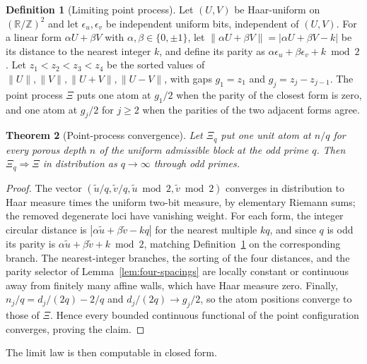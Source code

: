 \documentclass[11pt,a4paper]{article}
\newtheorem{theorem}{Theorem}[section]
\theoremstyle{definition}
\newtheorem{definition}[theorem]{Definition}
\theoremstyle{remark}
\begin{document}
\begin{definition}[Limiting point process]
  \label{def:porous-limit}
  Let $(U,V)$ be Haar-uniform on $(\mathbb{R}/\mathbb{Z})^2$ and let
  $\epsilon_u,\epsilon_v$ be independent uniform bits, independent of $(U,V)$.
  For a linear form $\alpha U+\beta V$ with $\alpha,\beta\in\{0,\pm1\}$, let
  $\|\alpha U+\beta V\|=|\alpha U+\beta V-k|$ be its distance to the nearest integer $k$,
  and define its parity as $\alpha\epsilon_u+\beta\epsilon_v+k\bmod2$.
  Let $z_1<z_2<z_3<z_4$ be the sorted values of
  $\|U\|,\|V\|,\|U+V\|,\|U-V\|$, with gaps $g_1=z_1$ and $g_j=z_j-z_{j-1}$.
  The point process $\Xi$ puts one atom at $g_1/2$ when the parity of the closest form is
  zero, and one atom at $g_j/2$ for $j\geq2$ when the parities of the two adjacent forms
  agree.
\end{definition}

\begin{theorem}[Point-process convergence]
  \label{thm:porous-convergence}
  Let $\Xi_q$ put one unit atom at $n/q$ for every porous depth $n$ of the uniform
  admissible block at the odd prime $q$.
  Then $\Xi_q\Rightarrow\Xi$ in distribution as $q\to\infty$ through odd primes.
\end{theorem}

\begin{proof}
  The vector $(\widetilde u/q,\widetilde v/q,\widetilde u\bmod2,\widetilde v\bmod2)$
  converges in distribution to Haar measure times the uniform two-bit measure, by
  elementary Riemann sums; the removed degenerate loci have vanishing weight.
  For each form, the integer circular distance is $|\alpha\widetilde u+\beta\widetilde v-kq|$
  for the nearest multiple $kq$, and since $q$ is odd its parity is
  $\alpha\widetilde u+\beta\widetilde v+k\bmod2$, matching
  Definition~\ref{def:porous-limit} on the corresponding branch.
  The nearest-integer branches, the sorting of the four distances, and the parity selector
  of Lemma~\ref{lem:four-spacings} are locally constant or continuous away from finitely
  many affine walls, which have Haar measure zero.
  Finally, $n_j/q=d_j/(2q)-2/q$ and $d_j/(2q)\to g_j/2$, so the atom positions converge to
  those of $\Xi$.
  Hence every bounded continuous functional of the point configuration converges, proving
  the claim.
\end{proof}

The limit law is then computable in closed form.
\end{document}
